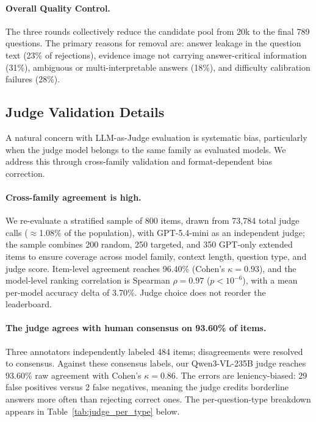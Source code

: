 \documentclass{article}
\begin{document}
\paragraph{Overall Quality Control.}
The three rounds collectively reduce the candidate pool from 20k to the final 789 questions. The primary reasons for removal are: answer leakage in the question text (23\% of rejections), evidence image not carrying answer-critical information (31\%), ambiguous or multi-interpretable answers (18\%), and difficulty calibration failures (28\%).



\subsection{Judge Validation Details}
\label{app:judge_validation}

A natural concern with LLM-as-Judge evaluation is systematic bias, particularly when the judge model belongs to the same family as evaluated models.
We address this through cross-family validation and format-dependent bias correction.

\paragraph{Cross-family agreement is high.}
We re-evaluate a stratified sample of 800 items, drawn from 73{,}784 total judge calls (${\approx}$1.08\% of the population), with GPT-5.4-mini as an independent judge; the sample combines 200 random, 250 targeted, and 350 GPT-only extended items to ensure coverage across model family, context length, question type, and judge score.
Item-level agreement reaches 96.40\% (Cohen's $\kappa = 0.93$), and the model-level ranking correlation is Spearman $\rho = 0.97$ ($p < 10^{-6}$), with a mean per-model accuracy delta of 3.70\%.
Judge choice does not reorder the leaderboard.

\paragraph{The judge agrees with human consensus on 93.60\% of items.}
Three annotators independently labeled 484 items; disagreements were resolved to consensus.
Against these consensus labels, our Qwen3-VL-235B judge reaches 93.60\% raw agreement with Cohen's $\kappa = 0.86$.
The errors are leniency-biased: 29 false positives versus 2 false negatives, meaning the judge credits borderline answers more often than rejecting correct ones.
The per-question-type breakdown appears in Table~\ref{tab:judge_per_type} below.
\end{document}
